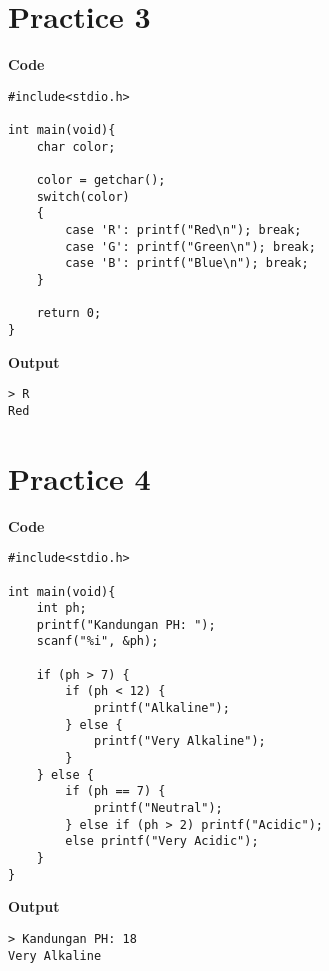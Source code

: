 \documentclass[a4paper, 10pt]{article}
\begin{document}
    \section*{Practice 3}
    \begin{minipage}[t]{0.55\textwidth}
        \large \textbf{Code}
        \begin{lstlisting}[style=code]
#include<stdio.h>

int main(void){
    char color;

    color = getchar();
    switch(color)
    {
        case 'R': printf("Red\n"); break;
        case 'G': printf("Green\n"); break;
        case 'B': printf("Blue\n"); break;
    }

    return 0;
}
        \end{lstlisting}
    \end{minipage}
    \hspace{0.5cm}
    \begin{minipage}[t]{0.4\textwidth}
        \large \textbf{Output}
        \begin{lstlisting}[style=output]
> R
Red
        \end{lstlisting}
    \end{minipage}

    \section*{Practice 4}
    \begin{minipage}[t]{0.55\textwidth}
        \large \textbf{Code}
        \begin{lstlisting}[style=code]
#include<stdio.h>

int main(void){
    int ph;
    printf("Kandungan PH: ");
    scanf("%i", &ph);

    if (ph > 7) {
        if (ph < 12) {
            printf("Alkaline");
        } else {
            printf("Very Alkaline");
        }
    } else {
        if (ph == 7) {
            printf("Neutral");
        } else if (ph > 2) printf("Acidic");
        else printf("Very Acidic");
    }
}
        \end{lstlisting}
    \end{minipage}
    \hspace{0.5cm}
    \begin{minipage}[t]{0.4\textwidth}
        \large \textbf{Output}
        \begin{lstlisting}[style=output]
> Kandungan PH: 18
Very Alkaline
        \end{lstlisting}
    \end{minipage}
\end{document}
